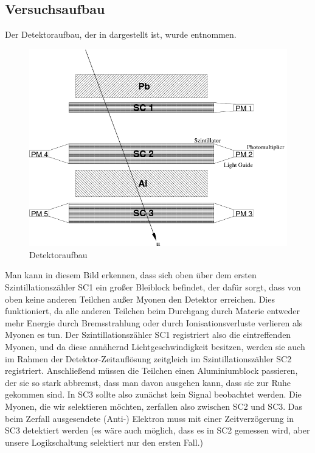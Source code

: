 \subsection{Versuchsaufbau}

Der Detektoraufbau, der in  dargestellt ist, wurde
\cite[Abb.3]{script} entnommen.
\begin{figure}[htb]
     \centering
     \includegraphics[width=1\columnwidth,keepaspectratio]{../docs/detector.png}
     \caption{Detektoraufbau}
     \label{fig:detector}
\end{figure}
Man kann in diesem Bild erkennen, dass sich oben über dem ersten
Szintillationszähler SC1 ein großer Bleiblock befindet, der dafür sorgt, dass
von oben keine anderen Teilchen außer Myonen den Detektor erreichen. Dies
funktioniert, da alle anderen Teilchen beim Durchgang durch Materie entweder
mehr Energie durch Bremsstrahlung oder durch Ionisationsverluste verlieren als
Myonen es tun. Der Szintillationszähler SC1 registriert also die eintreffenden
Myonen, und da diese annähernd Lichtgeschwindigkeit besitzen, werden sie auch
im Rahmen der Detektor-Zeitauflösung zeitgleich im Szintillationszähler SC2
registriert. Anschließend müssen die Teilchen einen Aluminiumblock passieren,
der sie so stark abbremst, dass man davon ausgehen kann, dass sie zur Ruhe
gekommen sind. In SC3 sollte also zunächst kein Signal beobachtet werden. Die
Myonen, die wir selektieren möchten, zerfallen also zwischen SC2 und SC3. Das
beim Zerfall ausgesendete (Anti-) Elektron muss mit einer Zeitverzögerung in
SC3 detektiert werden (es wäre auch möglich, dass es in SC2 gemessen wird, aber
unsere Logikschaltung selektiert nur den ersten Fall.)

